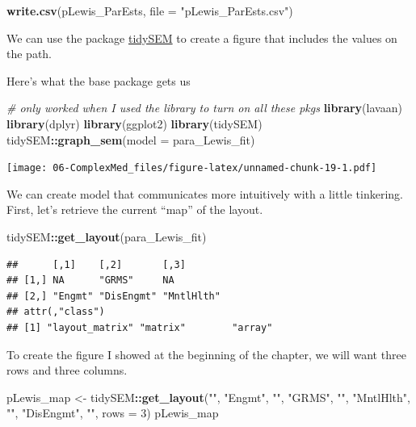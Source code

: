 \documentclass[
  11pt,
]{book}
\newenvironment{Shaded}{\begin{snugshade}}{\end{snugshade}}
\newcommand{\AttributeTok}[1]{\textcolor[rgb]{0.27,0.27,0.27}{#1}}
\newcommand{\CommentTok}[1]{\textcolor[rgb]{0.37,0.37,0.37}{\textit{#1}}}
\newcommand{\DecValTok}[1]{\textcolor[rgb]{0.06,0.06,0.06}{#1}}
\newcommand{\FunctionTok}[1]{\textcolor[rgb]{0.27,0.27,0.27}{\textbf{#1}}}
\newcommand{\NormalTok}[1]{#1}
\newcommand{\OtherTok}[1]{\textcolor[rgb]{0.37,0.37,0.37}{#1}}
\newcommand{\SpecialCharTok}[1]{\textcolor[rgb]{0.43,0.43,0.43}{\textbf{#1}}}
\newcommand{\StringTok}[1]{\textcolor[rgb]{0.5,0.5,0.5}{#1}}
\begin{document}
\begin{Shaded}
\begin{Highlighting}[]
\FunctionTok{write.csv}\NormalTok{(pLewis\_ParEsts, }\AttributeTok{file =} \StringTok{"pLewis\_ParEsts.csv"}\NormalTok{)}
\end{Highlighting}
\end{Shaded}

We can use the package \href{https://cjvanlissa.github.io/tidySEM/articles/Plotting_graphs.html}{tidySEM} to create a figure that includes the values on the path.

Here's what the base package gets us

\begin{Shaded}
\begin{Highlighting}[]
\CommentTok{\# only worked when I used the library to turn on all these pkgs}
\FunctionTok{library}\NormalTok{(lavaan)}
\FunctionTok{library}\NormalTok{(dplyr)}
\FunctionTok{library}\NormalTok{(ggplot2)}
\FunctionTok{library}\NormalTok{(tidySEM)}
\NormalTok{tidySEM}\SpecialCharTok{::}\FunctionTok{graph\_sem}\NormalTok{(}\AttributeTok{model =}\NormalTok{ para\_Lewis\_fit)}
\end{Highlighting}
\end{Shaded}

\texttt{[image: 06-ComplexMed\_files/figure-latex/unnamed-chunk-19-1.pdf]}

We can create model that communicates more intuitively with a little tinkering. First, let's retrieve the current ``map'' of the layout.

\begin{Shaded}
\begin{Highlighting}[]
\NormalTok{tidySEM}\SpecialCharTok{::}\FunctionTok{get\_layout}\NormalTok{(para\_Lewis\_fit)}
\end{Highlighting}
\end{Shaded}

\begin{verbatim}
##      [,1]    [,2]       [,3]      
## [1,] NA      "GRMS"     NA        
## [2,] "Engmt" "DisEngmt" "MntlHlth"
## attr(,"class")
## [1] "layout_matrix" "matrix"        "array"
\end{verbatim}

To create the figure I showed at the beginning of the chapter, we will want three rows and three columns.

\begin{Shaded}
\begin{Highlighting}[]
\NormalTok{pLewis\_map }\OtherTok{\textless{}{-}}\NormalTok{ tidySEM}\SpecialCharTok{::}\FunctionTok{get\_layout}\NormalTok{(}\StringTok{""}\NormalTok{, }\StringTok{"Engmt"}\NormalTok{, }\StringTok{""}\NormalTok{, }\StringTok{"GRMS"}\NormalTok{, }\StringTok{""}\NormalTok{, }\StringTok{"MntlHlth"}\NormalTok{,}
    \StringTok{""}\NormalTok{, }\StringTok{"DisEngmt"}\NormalTok{, }\StringTok{""}\NormalTok{, }\AttributeTok{rows =} \DecValTok{3}\NormalTok{)}
\NormalTok{pLewis\_map}
\end{Highlighting}
\end{Shaded}
\end{document}
